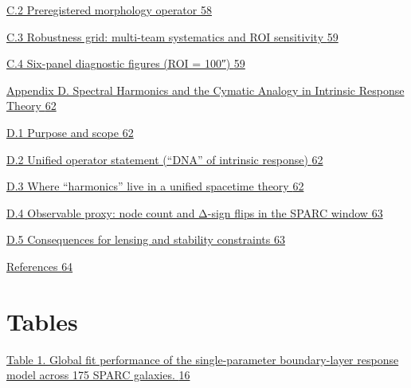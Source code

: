 \documentclass[11pt]{article}
\begin{document}
\hyperref[c.2-preregistered-morphology-operator]{C.2 Preregistered morphology operator \hyperref[c.2-preregistered-morphology-operator]{58}}

\hyperref[c.3-robustness-grid-multi-team-systematics-and-roi-sensitivity]{C.3 Robustness grid: multi-team systematics and ROI sensitivity \hyperref[c.3-robustness-grid-multi-team-systematics-and-roi-sensitivity]{59}}

\hyperref[c.4-six-panel-diagnostic-figures-roi-100]{C.4 Six-panel diagnostic figures (ROI = 100″) \hyperref[c.4-six-panel-diagnostic-figures-roi-100]{59}}

\hyperref[appendix-d.-spectral-harmonics-and-the-cymatic-analogy-in-intrinsic-response-theory]{Appendix D. Spectral Harmonics and the Cymatic Analogy in Intrinsic Response Theory \hyperref[appendix-d.-spectral-harmonics-and-the-cymatic-analogy-in-intrinsic-response-theory]{62}}

\hyperref[d.1-purpose-and-scope]{D.1 Purpose and scope \hyperref[d.1-purpose-and-scope]{62}}

\hyperref[d.2-unified-operator-statement-dna-of-intrinsic-response]{D.2 Unified operator statement (``DNA'' of intrinsic response) \hyperref[d.2-unified-operator-statement-dna-of-intrinsic-response]{62}}

\hyperref[d.3-where-harmonics-live-in-a-unified-spacetime-theory]{D.3 Where ``harmonics'' live in a unified spacetime theory \hyperref[d.3-where-harmonics-live-in-a-unified-spacetime-theory]{62}}

\hyperref[d.4-observable-proxy-node-count-and-ux3b4-sign-flips-in-the-sparc-window]{D.4 Observable proxy: node count and Δ-sign flips in the SPARC window \hyperref[d.4-observable-proxy-node-count-and-ux3b4-sign-flips-in-the-sparc-window]{63}}

\hyperref[d.5-consequences-for-lensing-and-stability-constraints]{D.5 Consequences for lensing and stability constraints \hyperref[d.5-consequences-for-lensing-and-stability-constraints]{63}}

\hyperref[references]{References \hyperref[references]{64}}

\section{Tables}\label{tables}

\hyperref[_Toc222952631]{Table 1. Global fit performance of the single-parameter boundary-layer response model across 175 SPARC galaxies. \hyperref[_Toc222952631]{16}}
\end{document}
